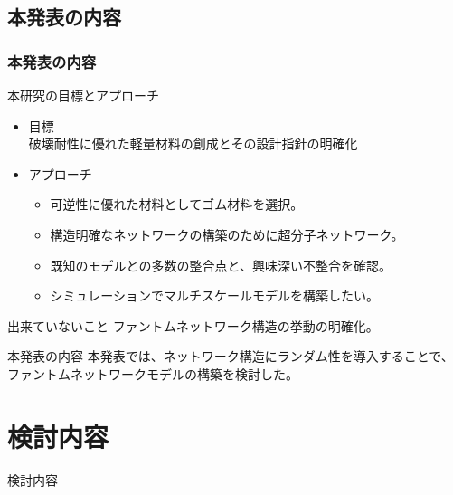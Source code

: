 \documentclass[11pt, dvipdfmx]{beamer}
\begin{document}
\subsection{本発表の内容}
\begin{frame}
\frametitle{本発表の内容}
\vspace{-2mm}
\begin{exampleblock}{本研究の目標とアプローチ}
\begin{itemize}
\item
目標\\
破壊耐性に優れた軽量材料の創成とその設計指針の明確化
\item
アプローチ
	\begin{itemize}
	\item
	可逆性に優れた材料としてゴム材料を選択。
	\item
	構造明確なネットワークの構築のために超分子ネットワーク。
	\item
	既知のモデルとの\color{red}多数の整合点と、興味深い不整合\color{black}を確認。
	\item
	\color{red}シミュレーションでマルチスケールモデル\color{black}を構築したい。
	\end{itemize}
\end{itemize}
\end{exampleblock}
\vspace{-1mm}
\begin{alertblock}{出来ていないこと}
ファントムネットワーク構造の挙動の明確化。
\end{alertblock}
\vspace{-1mm}
\begin{block}{本発表の内容}
本発表では、ネットワーク構造にランダム性を導入することで、ファントムネットワークモデルの構築を検討した。
\end{block}
\end{frame}
\section{検討内容}
\begin{frame}
\LARGE{検討内容}
\end{frame}
\end{document}
